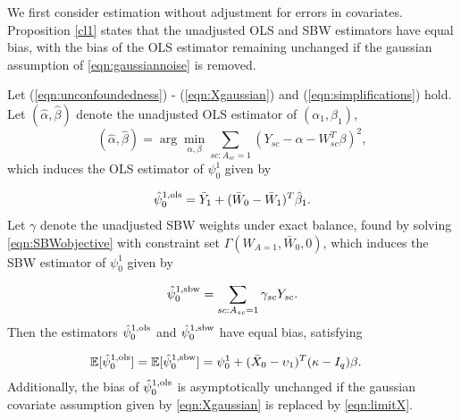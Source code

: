 
We first consider estimation without adjustment for errors in covariates. 
Proposition \ref{cl1} states that the unadjusted OLS and SBW estimators have equal bias, with the bias of the OLS estimator remaining unchanged if the gaussian assumption of \eqref{eqn:gaussiannoise} is removed.

\begin{proposition}\label{cl1}
Let (\ref{eqn:unconfoundedness}) - (\ref{eqn:Xgaussian}) and (\ref{eqn:simplifications}) hold.
Let $(\hat{\alpha}, \hat{\beta})$ denote the unadjusted OLS estimator of $(\alpha_1, \beta_1)$, 
\begin{equation}\label{eqn:prop1.beta}
(\hat{\alpha}, \hat{\beta}) = \arg \min_{\alpha, \beta} \sum_{sc:A_{sc}=1} (Y_{sc} - \alpha -  W_{sc}^T\beta)^2,
\end{equation}
which induces the OLS estimator of $\psi_0^1$ given by

\begin{align*}
\hat{\psi}^{1,\textup{ols}}_0 = \bar{Y}_1 + (\bar{W}_0 - \bar{W}_1)^T\hat{\beta}_1.
\end{align*}
%
Let ${\gamma}$ denote the unadjusted SBW weights under exact balance, found by solving \eqref{eqn:SBWobjective} with constraint set $\Gamma( W_{A=1}, \bar{W}_0, 0)$, which induces the SBW estimator of $\psi_0^1$ given by

\begin{align*}
\hat{\psi}^{1,\textup{sbw}}_0 = \sum_{sc: A_{sc} = 1} {\gamma}_{sc} Y_{sc}.
\end{align*}
%
Then the estimators $\hat{\psi}^{1, \textup{ols}}_0$ and $\hat{\psi}^{1, \textup{sbw}}_0$ have equal bias, satisfying

\begin{align*}
\mathbb{E}[\hat{\psi}_0^{1,\textup{ols}}] &= \mathbb{E}[\hat{\psi}^{1, \textup{sbw}}_0]  = \psi_0^1 + (\bar{X}_0 - \upsilon_1)^T(\mathbf{\kappa} - I_q)\beta.
\end{align*}
Additionally, the bias of $\hat{\psi}_0^{1,\textup{ols}}$ is asymptotically unchanged if the gaussian covariate assumption given by \eqref{eqn:Xgaussian} is replaced by \eqref{eqn:limitX}.
\end{proposition}

